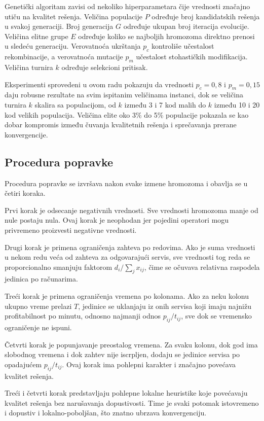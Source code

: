 \documentclass[12pt]{article}
\begin{document}
Genetički algoritam zavisi od nekoliko hiperparametara čije vrednosti značajno utiču na kvalitet rešenja. Veličina populacije $P$ određuje broj kandidatskih rešenja u svakoj generaciji. Broj generacija $G$ određuje ukupan broj iteracija evolucije. Veličina elitne grupe $E$ određuje koliko se najboljih hromozoma direktno prenosi u sledeću generaciju. Verovatnoća ukrštanja $p_c$ kontroliše učestalost rekombinacije, a verovatnoća mutacije $p_m$ učestalost stohastičkih modifikacija. Veličina turnira $k$ određuje selekcioni pritisak.

Eksperimenti sprovedeni u ovom radu pokazuju da vrednosti $p_c = 0{,}8$ i $p_m = 0{,}15$ daju robusne rezultate na svim ispitanim veličinama instanci, dok se veličina turnira $k$ skalira sa populacijom, od $k$ između 3 i 7 kod malih do $k$ između 10 i 20 kod velikih populacija. Veličina elite oko 3\% do 5\% populacije pokazala se kao dobar kompromis između čuvanja kvalitetnih rešenja i sprečavanja prerane konvergencije.

\subsection{Procedura popravke}\label{sec:popravka}

Procedura popravke se izvršava nakon svake izmene hromozoma i obavlja se u četiri koraka.

Prvi korak je odsecanje negativnih vrednosti. Sve vrednosti hromozoma manje od nule postaju nula. Ovaj korak je neophodan jer pojedini operatori mogu privremeno proizvesti negativne vrednosti.

Drugi korak je primena ograničenja zahteva po redovima. Ako je suma vrednosti u nekom redu veća od zahteva za odgovarajući servis, sve vrednosti tog reda se proporcionalno smanjuju faktorom $d_i / \sum_j x_{ij}$, čime se očuvava relativna raspodela jedinica po računarima.

Treći korak je primena ograničenja vremena po kolonama. Ako za neku kolonu ukupno vreme prelazi $T$, jedinice se uklanjaju iz onih servisa koji imaju najnižu profitabilnost po minutu, odnosno najmanji odnos $p_{ij}/t_{ij}$, sve dok se vremensko ograničenje ne ispuni.

Četvrti korak je popunjavanje preostalog vremena. Za svaku kolonu, dok god ima slobodnog vremena i dok zahtev nije iscrpljen, dodaju se jedinice servisa po opadajućem $p_{ij}/t_{ij}$. Ovaj korak ima pohlepni karakter i značajno povećava kvalitet rešenja.

Treći i četvrti korak predstavljaju pohlepne lokalne heuristike koje povećavaju kvalitet rešenja bez narušavanja dopustivosti. Time je svaki potomak istovremeno i dopustiv i lokalno-poboljšan, što znatno ubrzava konvergenciju.
\end{document}
